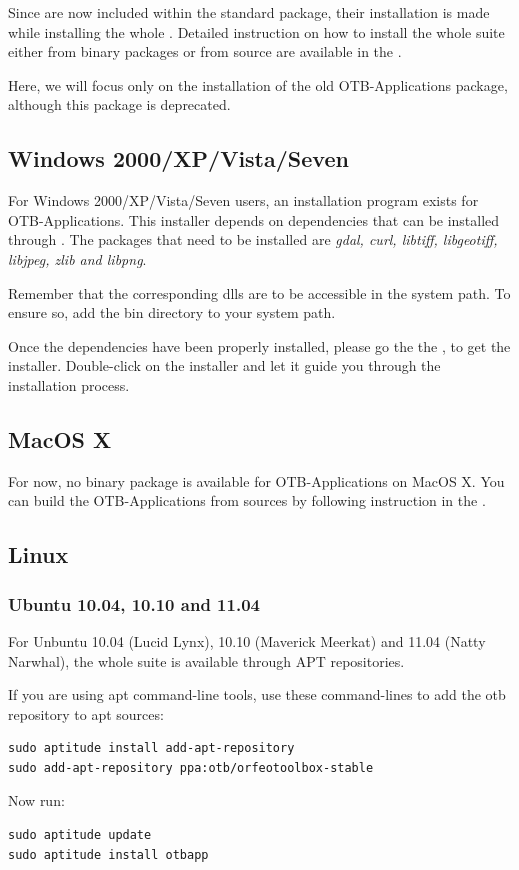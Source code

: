Since \app are now included within the standard \otb package, their 
installation is made while installing the whole \otb. Detailed 
instruction on how to install the whole \otb suite either from 
binary packages or from source are available in the \sg. 

Here, we will focus only on the installation of the old OTB-Applications 
package, although this package is deprecated.

\subsection{Windows 2000/XP/Vista/Seven}
\label{ssec:app_windows_binaries}

For Windows 2000/XP/Vista/Seven users, an installation program exists
for OTB-Applications. This installer depends on dependencies that can
be installed through \osgeow. The packages that need to be installed
are \emph{gdal, curl, libtiff, libgeotiff, libjpeg, zlib and libpng}.

Remember that the corresponding dlls are to be accessible in the
system path. To ensure so, add the \osgeow bin directory to your
system path.

 Once the dependencies have been properly installed, please go the the
 \download, to get the installer. Double-click on the installer and
 let it guide you through the installation process.

\subsection{MacOS X}
\label{ssec:mac_binaries}

For now, no binary package is available for OTB-Applications on 
MacOS X. You can build the OTB-Applications from sources by 
following instruction in the \sg.

\subsection{Linux}

\subsubsection{Ubuntu 10.04, 10.10 and 11.04}
\label{ssec:ubuntu_binaries}
For Unbuntu 10.04 (Lucid Lynx), 10.10 (Maverick Meerkat) and 11.04
(Natty Narwhal), the whole \otb suite is available through APT repositories.

If you are using apt command-line tools, use these command-lines to
add the otb repository to apt sources:
\begin{verbatim}
sudo aptitude install add-apt-repository 
sudo add-apt-repository ppa:otb/orfeotoolbox-stable
\end{verbatim}
Now run:
\begin{verbatim}
sudo aptitude update
sudo aptitude install otbapp
\end{verbatim}


